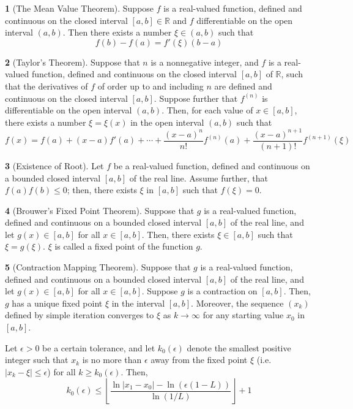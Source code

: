 \documentclass[12pt]{article}
\theoremstyle{definition}
\newtheorem{theorem}{\color{ForestGreen}{\textbf{Theorem}}}
\newcommand{\R}{\mathbb{R}}
\begin{document}
\begin{theorem}[The Mean Value Theorem]
Suppose $f$ is a real-valued function, defined and continuous on the closed interval $[a,b] \in \R$ and $f$ differentiable on the open interval $(a,b)$. Then there exists a number $\xi \in (a,b)$ such that
\begin{equation}
f(b) - f(a) = f'(\xi) (b - a)
\end{equation}
\end{theorem}

\begin{theorem}[Taylor's Theorem]
Suppose that $n$ is a nonnegative integer, and $f$ is a real-valued function, defined and continuous on the closed interval $[a,b]$ of $\R$, such that the derivatives of $f$ of order up to and including $n$ are defined and continuous on the closed interval $[a,b]$. Suppose further that $f^{(n)}$ is differentiable on the open interval $(a,b)$. Then, for each value of $x \in [a,b]$, there exists a number $\xi = \xi(x)$ in the open interval $(a,b)$ such that
\begin{equation}
f(x) = f(a) + (x-a)f'(a) + \cdots + \frac{(x-a)^n}{n!} f^{(n)}(a) + \frac{(x-a)^{n+1}}{(n+1)!} f^{(n+1)}(\xi)
\end{equation}
\end{theorem}

\begin{theorem}[Existence of Root]\label{zeroexists}
Let $f$ be a real-valued function, defined and continuous on a bounded closed interval $[a,b]$ of the real line. Assume further, that $f(a)f(b) \leq 0$; then, there exists $\xi$ in $[a,b]$ such that $f(\xi) = 0$.
\end{theorem}

\begin{theorem}[Brouwer's Fixed Point Theorem]
Suppose that $g$ is a real-valued function, defined and continuous on a bounded closed interval $[a,b]$ of the real line, and let $g(x) \in [a,b]$ for all $x \in [a,b]$. Then, there exists $\xi \in [a,b]$ such that $\xi = g(\xi)$. $\xi$ is called a fixed point of the function $g$.
\end{theorem}

\begin{theorem}[Contraction Mapping Theorem]
Suppose that $g$ is a real-valued function, defined and continuous on a bounded closed interval $[a,b]$ of the real line, and let $g(x) \in [a,b]$ for all $x \in [a,b]$. Suppose $g$ is a contraction on $[a,b]$. Then, $g$ has a unique fixed point $\xi$ in the interval $[a,b]$. Moreover, the sequence $(x_k)$ defined by simple iteration converges to $\xi$ as $k \to \infty$ for any starting value $x_0$ in $[a,b]$.

Let $\epsilon > 0$ be a certain tolerance, and let $k_0 (\epsilon)$ denote the smallest positive integer such that $x_k$ is no more than $\epsilon$ away from the fixed point $\xi$ (i.e. $|x_k - \xi| \leq \epsilon$) for all $k \geq k_0 (\epsilon)$. Then,
\begin{equation}
k_0 (\epsilon) \leq \left\lfloor \frac{\ln|x_1 - x_0| - \ln(\epsilon (1 - L))}{\ln (1 / L)}\right\rfloor + 1
\end{equation}
\end{theorem}
\end{document}
